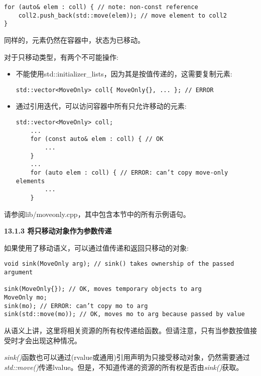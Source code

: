 \begin{lstlisting}[caption={}]
for (auto& elem : coll) { // note: non-const reference
	coll2.push_back(std::move(elem)); // move element to coll2
}
\end{lstlisting}

同样的，元素仍然在容器中，状态为已移动。\par

对于只移动类型，有两个不可能操作:\par

\begin{itemize}
	\item 不能使用std::initializer\_lists，因为其是按值传递的，这需要复制元素:
	\begin{lstlisting}[caption={}]
	std::vector<MoveOnly> coll{ MoveOnly{}, ... }; // ERROR
	\end{lstlisting}
	\item 通过引用迭代，可以访问容器中所有只允许移动的元素:
	\begin{lstlisting}[caption={}]
	std::vector<MoveOnly> coll;
	...
	for (const auto& elem : coll) { // OK
		...
	}
	...
	for (auto elem : coll) { // ERROR: can’t copy move-only elements
		...
	}
	\end{lstlisting}
\end{itemize}

请参阅lib/moveonly.cpp，其中包含本节中的所有示例语句。\par

\hspace*{\fill} \par %
\textbf{13.1.3 将只移动对象作为参数传递}

如果使用了移动语义，可以通过值传递和返回只移动的对象:\par

\begin{lstlisting}[caption={}]
void sink(MoveOnly arg); // sink() takes ownership of the passed argument

sink(MoveOnly{}); // OK, moves temporary objects to arg
MoveOnly mo;
sink(mo); // ERROR: can’t copy mo to arg
sink(std::move(mo)); // OK, moves mo to arg because passed by value
\end{lstlisting}

从语义上讲，这里将相关资源的所有权传递给函数。但请注意，只有当参数按值接受时才会出现这种情况。\par

\textit{sink()}函数也可以通过(rvalue或通用)引用声明为只接受移动对象，仍然需要通过\textit{std::move()}传递lvalue。但是，不知道传递的资源的所有权是否由\textit{sink()}获取。\par

